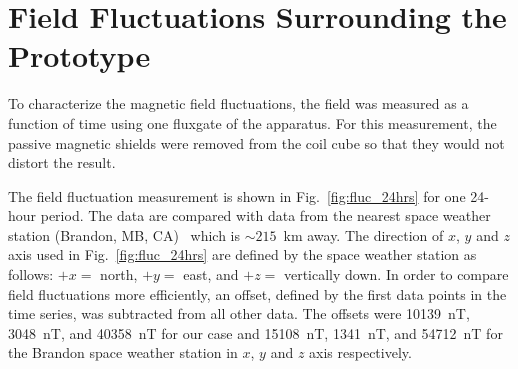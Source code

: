 








\section{Field Fluctuations Surrounding the Prototype}\label{sec:field}
 

To characterize the magnetic field fluctuations, the field was measured as a function of time using one fluxgate of the apparatus. For this measurement, the passive magnetic shields were removed from the coil cube so that they would not distort the result.



The field fluctuation measurement is shown in Fig.~\ref{fig:fluc_24hrs} for one 24-hour period. The data are compared with data from the nearest space weather station (Brandon, MB, CA)~\cite{weather_station} which is $\sim215$~km away. The direction of $x$, $y$ and $z$ axis used in Fig.~\ref{fig:fluc_24hrs} are defined by the space weather station as follows: $+x=$ north, $+y=$ east, and $+z=$ vertically down.
In order to compare field fluctuations more efficiently, an offset, defined by the first data points in the time series, was subtracted from all other data. The offsets were 10139~nT, 3048~nT, and 40358~nT for our case and 15108~nT, 1341~nT, and 54712~nT for the Brandon space weather station in $x$, $y$ and $z$ axis respectively.


